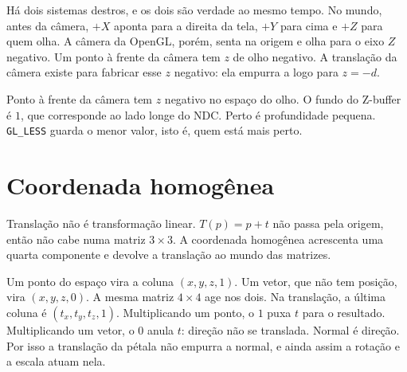 \documentclass[11pt,a4paper]{article}
\newenvironment{figura}
  {\par\medskip\noindent\begin{minipage}{\linewidth}\centering}
  {\end{minipage}\par\medskip}
\newcommand{\fn}[1]{\texttt{\nobreak\hspace{0pt}#1}}
\begin{document}
\begin{figura}
\end{figura}

Há dois sistemas destros, e os dois são verdade ao mesmo tempo. No mundo, antes da câmera, \(+X\) aponta para a direita da tela, \(+Y\) para cima e \(+Z\) para quem olha. A câmera da OpenGL, porém, senta na origem e olha para o eixo \(Z\) negativo. Um ponto à frente da câmera tem \(z\) de olho negativo. A translação da câmera existe para fabricar esse \(z\) negativo: ela empurra a logo para \(z = -d\).

\begin{voz}
Ponto à frente da câmera tem \(z\) negativo no espaço do olho. O fundo do Z-buffer é \(1\), que corresponde ao lado longe do NDC. Perto é profundidade pequena. \fn{GL\_LESS} guarda o menor valor, isto é, quem está mais perto.
\end{voz}

\section{Coordenada homogênea}
\label{sec:homog}

Translação não é transformação linear. \(T(p) = p + t\) não passa pela origem, então não cabe numa matriz \(3\times 3\). A coordenada homogênea acrescenta uma quarta componente e devolve a translação ao mundo das matrizes.

Um ponto do espaço vira a coluna \((x, y, z, 1)\). Um vetor, que não tem posição, vira \((x, y, z, 0)\). A mesma matriz \(4\times 4\) age nos dois. Na translação, a última coluna é \((t_x, t_y, t_z, 1)\). Multiplicando um ponto, o \(1\) puxa \(t\) para o resultado. Multiplicando um vetor, o \(0\) anula \(t\): direção não se translada. Normal é direção. Por isso a translação da pétala não empurra a normal, e ainda assim a rotação e a escala atuam nela.
\end{document}
